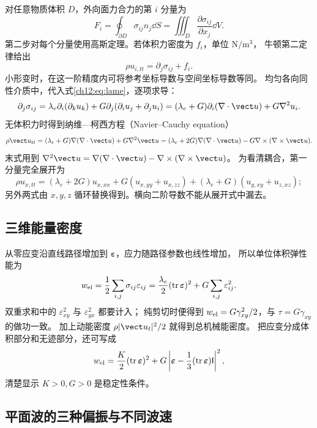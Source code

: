 对任意物质体积 $D$，外向面力合力的第 $i$ 分量为
\[
 F_i=\oint_{\partial D}\sigma_{ij}n_j\dd S
 =\iiint_D\frac{\partial\sigma_{ij}}{\partial x_j}\dd V.
\]
第二步对每个分量使用高斯定理。若体积力密度为 $f_i$，单位 $\mathrm{N/m^3}$，
牛顿第二定律给出
\begin{equation}
 \rho u_{i,tt}=\partial_j\sigma_{ij}+f_i.
 \label{ch12:eq:stress-div}
\end{equation}
小形变时，在这一阶精度内可将参考坐标导数与空间坐标导数等同。
均匀各向同性介质中，代入式\eqref{ch12:eq:lame}，逐项求导：
\[
 \partial_j\sigma_{ij}
 =\lambda_e\partial_i(\partial_k u_k)
   +G\partial_j(\partial_i u_j+\partial_j u_i)
 =(\lambda_e+G)\partial_i(\nabla\cdot\vect u)+G\nabla^2u_i.
\]
无体积力时得到纳维—柯西方程（Navier--Cauchy equation）
\begin{equation}
 \rho\vect u_{tt}=(\lambda_e+G)\nabla(\nabla\cdot\vect u)+G\nabla^2\vect u
 =(\lambda_e+2G)\nabla(\nabla\cdot\vect u)-G\nabla\times(\nabla\times\vect u).
 \label{ch12:eq:navier}
\end{equation}
末式用到 $\nabla^2\vect u=\nabla(\nabla\cdot\vect u)-\nabla\times(\nabla\times\vect u)$。
为看清耦合，第一分量完全展开为
\[
 \rho u_{x,tt}=(\lambda_e+2G)u_{x,xx}
 +G(u_{x,yy}+u_{x,zz})
 +(\lambda_e+G)(u_{y,xy}+u_{z,xz});
\]
另外两式由 $x,y,z$ 循环替换得到。横向二阶导数不能从展开式中漏去。

\subsection{三维能量密度}

从零应变沿直线路径增加到 $\boldsymbol\varepsilon$，应力随路径参数也线性增加，
所以单位体积弹性能为
\begin{equation}
 w_{\rm el}=\frac12\sum_{i,j}\sigma_{ij}\varepsilon_{ij}
 =\frac{\lambda_e}{2}(\operatorname{tr}\boldsymbol\varepsilon)^2
   +G\sum_{i,j}\varepsilon_{ij}^2.
 \label{ch12:eq:elastic-energy}
\end{equation}
双重求和中的 $\varepsilon_{xy}^2$ 与 $\varepsilon_{yx}^2$ 都要计入；
纯剪切时便得到 $w_{\rm el}=G\gamma_{xy}^2/2$，与 $\tau=G\gamma_{xy}$ 的做功一致。
加上动能密度 $\rho|\vect u_t|^2/2$ 就得到总机械能密度。
把应变分成体积部分和无迹部分，还可写成
\[
 w_{\rm el}=\frac K2(\operatorname{tr}\boldsymbol\varepsilon)^2
 +G\left|\boldsymbol\varepsilon-\frac13
 (\operatorname{tr}\boldsymbol\varepsilon)\mathsf I\right|^2,
\]
清楚显示 $K>0,G>0$ 是稳定性条件。

\subsection{平面波的三种偏振与不同波速}

